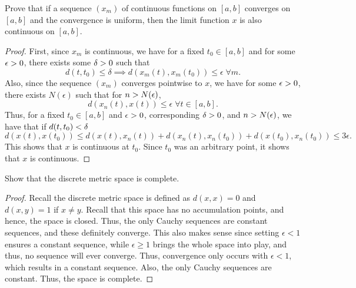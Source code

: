 \begin{question}
    Prove that if a sequence $(x_m)$  of continuous functions on $[a,b]$ converges on $[a,b]$ and the convergence is uniform, then the limit function $x$ is also continuous on $[a,b]$.
    \label{section1.5-9}
\end{question}
\begin{proof}
    First, since $x_m$ is continuous, we have for a fixed $t_0 \in [a,b]$ and for some $\epsilon > 0$, there exists some $\delta > 0$ such that
    \[d(t,t_0) \leq \delta \implies d(x_m(t) , x_m(t_0)) \leq \epsilon \; \forall m.\]
    Also, since the sequence $(x_m)$ converges pointwise to $x$, we have for some $\epsilon > 0$, there exists $N(\epsilon)$ such that for $n > N(\epsilon)$, 
    \[d(x_n(t),x(t)) \leq \epsilon \; \forall t \in [a,b].\]
    Thus, for a fixed $t_0 \in [a,b]$ and $\epsilon > 0$, corresponding $\delta > 0$, and $n > N(\epsilon)$, we have that if $d(t,t_0) < \delta$
    \[d(x(t) , x(t_0)) \leq d(x(t) ,x_n(t)) + d(x_n(t) , x_n(t_0)) + d(x(t_0) , x_n(t_0)) \leq 3\epsilon.\]
    This shows that $x$ is continuous at $t_0$. Since $t_0$ was an arbitrary point, it shows that $x$ is continuous.
\end{proof}

\begin{question}
    Show that the discrete metric space is complete.
    \label{section1.5-10}
\end{question}
\begin{proof}
    Recall the discrete metric space is defined as $d(x,x) = 0$ and $d(x,y) = 1$ if $x \neq y$. Recall that this space has no accumulation points, and hence, the space is closed. Thus, the only Cauchy sequences are constant sequences, and these definitely converge. This also makes sense since setting $\epsilon < 1$ ensures a constant sequence, while $\epsilon \geq 1$ brings the whole space into play, and thus, no sequence will ever converge. Thus, convergence only occurs with $\epsilon < 1$, which results in a constant sequence. Also, the only Cauchy sequences are constant. Thus, the space is complete.
\end{proof}


